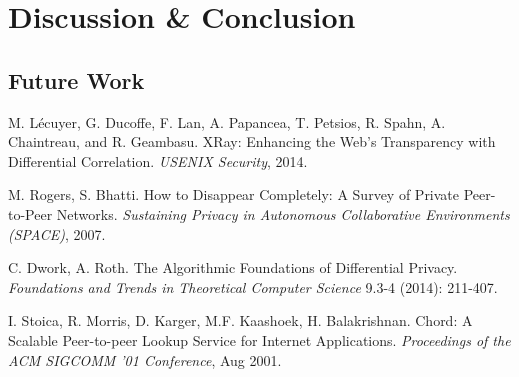 \documentclass{article}
\begin{document}
\section{Discussion \& Conclusion}

\subsection{Future Work}\label{sec:future}

\begin{thebibliography}{9}

	M. L\'ecuyer, G. Ducoffe, F. Lan, A. Papancea, T. Petsios, R. Spahn, A. Chaintreau, and R. Geambasu.
	XRay: Enhancing the Web's Transparency with Differential Correlation.
	\emph{USENIX Security}, 2014.

	M. Rogers, S. Bhatti.
	How to Disappear Completely: A Survey of Private Peer-to-Peer Networks.
	\emph{Sustaining Privacy in Autonomous Collaborative Environments (SPACE)}, 2007.

	C. Dwork, A. Roth.
	The Algorithmic Foundations of Differential Privacy.
	\emph{Foundations and Trends in Theoretical Computer Science} 9.3-4 (2014): 211-407.

	I. Stoica, R. Morris, D. Karger, M.F. Kaashoek, H. Balakrishnan.
	Chord: A Scalable Peer-to-peer Lookup Service for {Internet} Applications.
	\emph{Proceedings of the {ACM} {SIGCOMM} '01 Conference}, Aug 2001.

\end{thebibliography}
\end{document}
